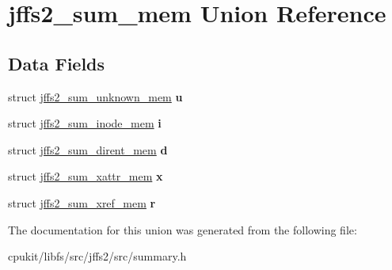 \hypertarget{unionjffs2__sum__mem}{}\section{jffs2\+\_\+sum\+\_\+mem Union Reference}
\label{unionjffs2__sum__mem}
\subsection*{Data Fields}
\begin{DoxyCompactItemize}
\item 
\mbox{\label{unionjffs2__sum__mem_a793151c847ac889939d7d4fe8cbe768f}} 
struct \mbox{\hyperlink{structjffs2__sum__unknown__mem}{jffs2\+\_\+sum\+\_\+unknown\+\_\+mem}} {\bfseries u}
\item 
\mbox{\label{unionjffs2__sum__mem_a421d24d3b0347fabbc4f2e0e31ef7c7c}} 
struct \mbox{\hyperlink{structjffs2__sum__inode__mem}{jffs2\+\_\+sum\+\_\+inode\+\_\+mem}} {\bfseries i}
\item 
\mbox{\label{unionjffs2__sum__mem_ade9b6b3dd3895555869ff155be191b84}} 
struct \mbox{\hyperlink{structjffs2__sum__dirent__mem}{jffs2\+\_\+sum\+\_\+dirent\+\_\+mem}} {\bfseries d}
\item 
\mbox{\label{unionjffs2__sum__mem_a8e24c2f81c5d0f5c340b8597db6502b3}} 
struct \mbox{\hyperlink{structjffs2__sum__xattr__mem}{jffs2\+\_\+sum\+\_\+xattr\+\_\+mem}} {\bfseries x}
\item 
\mbox{\label{unionjffs2__sum__mem_a4268f13dd2a9b4dd4a92d8429cbc75bc}} 
struct \mbox{\hyperlink{structjffs2__sum__xref__mem}{jffs2\+\_\+sum\+\_\+xref\+\_\+mem}} {\bfseries r}
\end{DoxyCompactItemize}


The documentation for this union was generated from the following file\+:\begin{DoxyCompactItemize}
\item 
cpukit/libfs/src/jffs2/src/summary.\+h\end{DoxyCompactItemize}
